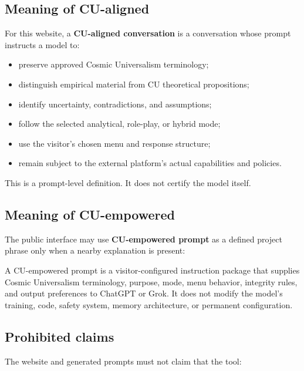 \documentclass[11pt,letterpaper]{article}
\begin{document}
\subsection{Meaning of CU-aligned}

For this website, a \textbf{CU-aligned conversation} is a conversation whose
prompt instructs a model to:

\begin{itemize}
    \item preserve approved Cosmic Universalism terminology;
    \item distinguish empirical material from CU theoretical propositions;
    \item identify uncertainty, contradictions, and assumptions;
    \item follow the selected analytical, role-play, or hybrid mode;
    \item use the visitor's chosen menu and response structure;
    \item remain subject to the external platform's actual capabilities and policies.
\end{itemize}

This is a prompt-level definition. It does not certify the model itself.

\subsection{Meaning of CU-empowered}

The public interface may use \textbf{CU-empowered prompt} as a defined project
phrase only when a nearby explanation is present:

\begin{notebox}
A CU-empowered prompt is a visitor-configured instruction package that supplies
Cosmic Universalism terminology, purpose, mode, menu behavior, integrity rules,
and output preferences to ChatGPT or Grok. It does not modify the model's
training, code, safety system, memory architecture, or permanent configuration.
\end{notebox}

\subsection{Prohibited claims}

The website and generated prompts must not claim that the tool:
\end{document}
